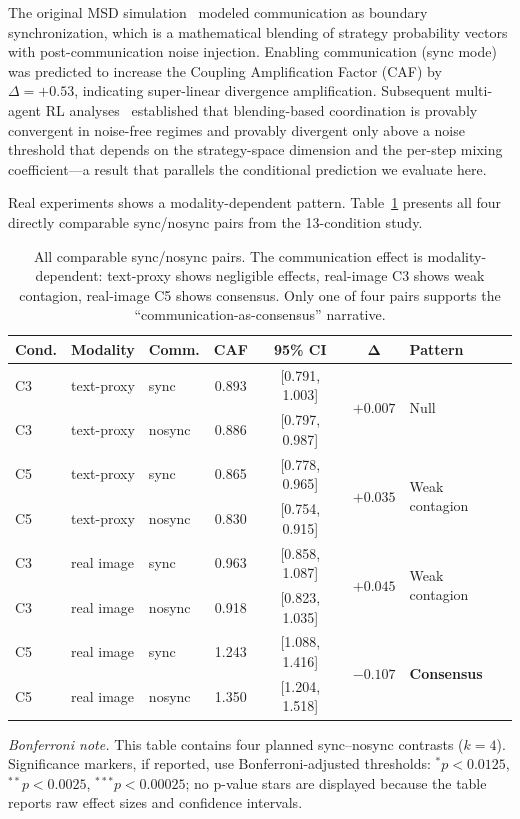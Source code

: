 \documentclass[11pt]{article}
\begin{document}
The original MSD simulation~\cite{mmepc2026} modeled communication as boundary synchronization, which is a mathematical blending of strategy probability vectors with post-communication noise injection. Enabling communication (sync mode) was predicted to increase the Coupling Amplification Factor (CAF) by $\Delta = +0.53$, indicating super-linear divergence amplification. Subsequent multi-agent RL analyses~\cite{kapetanakis2014balanced,foerster2016learning} established that blending-based coordination is provably convergent in noise-free regimes and provably divergent only above a noise threshold that depends on the strategy-space dimension and the per-step mixing coefficient---a result that parallels the conditional prediction we evaluate here.

Real experiments shows a modality-dependent pattern. Table~\ref{tab:sync-pairs} presents all four directly comparable sync/nosync pairs from the 13-condition study.

\begin{table}[t]
\centering
\caption{All comparable sync/nosync pairs. The communication effect is modality-dependent: text-proxy shows negligible effects, real-image C3 shows weak contagion, real-image C5 shows consensus. Only one of four pairs supports the ``communication-as-consensus'' narrative.}
\label{tab:sync-pairs}
\begin{tabular}{@{}lllcccl@{}}
\toprule
\textbf{Cond.} & \textbf{Modality} & \textbf{Comm.} & \textbf{CAF} & \textbf{95\% CI} & $\boldsymbol{\Delta}$ & \textbf{Pattern} \\
\midrule
C3 & text-proxy  & sync   & 0.893 & [0.791, 1.003] & \multirow{2}{*}{$+0.007$} & \multirow{2}{*}{Null} \\
C3 & text-proxy  & nosync & 0.886 & [0.797, 0.987] & & \\
\midrule
C5 & text-proxy  & sync   & 0.865 & [0.778, 0.965] & \multirow{2}{*}{$+0.035$} & \multirow{2}{*}{Weak contagion} \\
C5 & text-proxy  & nosync & 0.830 & [0.754, 0.915] & & \\
\midrule
C3 & real image  & sync   & 0.963 & [0.858, 1.087] & \multirow{2}{*}{$+0.045$} & \multirow{2}{*}{Weak contagion} \\
C3 & real image  & nosync & 0.918 & [0.823, 1.035] & & \\
\midrule
C5 & real image  & sync   & 1.243 & [1.088, 1.416] & \multirow{2}{*}{$\mathbf{-0.107}$} & \multirow{2}{*}{\textbf{Consensus}} \\
C5 & real image  & nosync & 1.350 & [1.204, 1.518] & & \\
\bottomrule
\end{tabular}
\vspace{0.35em}
\begin{minipage}{0.95\linewidth}
\footnotesize\emph{Bonferroni note.} This table contains four planned sync--nosync contrasts ($k=4$). Significance markers, if reported, use Bonferroni-adjusted thresholds: $^{*}p<0.0125$, $^{**}p<0.0025$, $^{***}p<0.00025$; no p-value stars are displayed because the table reports raw effect sizes and confidence intervals.
\end{minipage}
\end{table}
\end{document}
